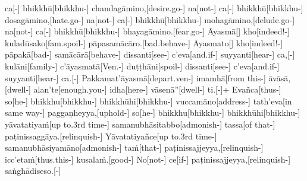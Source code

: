\documentclass[12pt]{article}
\newcommand{\EnglishColumn}[1]{\itshape\footnotesize{#1}}
\begin{document}
\begin{paracol}{2}
\begin{column}
\begin{flushleft}
ca[-\NUL{\GMU{}}] bhikkhū[bhikkhu-] chandagāmino,[desire.go-] na[not-] ca[-\NUL{\GMU{}}] bhikkhū[bhikkhu-] dosagāmino,[hate.go-] na[not-] ca[-\NUL{\GMU{}}] bhikkhū[bhikkhu-] mohagāmino,[delude.go-] na[not-] ca[-\NUL{\GMU{}}] bhikkhū[bhikkhu-] bhayagāmino.[fear.go-] Āyasmā[] kho[indeed!-] kuladūsako[fam.spoil-] pāpasamācāro.[bad.behave-] Āyasmato[] kho[indeed!-] pāpakā[bad-] samācārā[behave-] dissanti[see-] c’eva[and.if-\NUL{\GMU{}}] suyyanti[hear-] ca,[-\NUL{\GMU{}}] kulāni[family-] c’āyasmatā[Ven.-] duṭṭhāni[spoil-] dissanti[see-] c’eva[and.if-\NUL{\GMU{}}] suyyanti[hear-] ca.[-\NUL{\GMU{}}] Pakkamat’āyasmā[depart.ven-] imamhā[from this-] āvāsā,[dwell-] alan’te[enough.you-] idha[here-] vāsenā”[dwell-] ti.[-\NUL{\GMU{}}]+ Evañca[thus-] so[he-] bhikkhu[bhikkhu-] bhikkhūhi[bhikkhu-] vuccamāno[address-] tath’eva[in same way-\NUL{\GMU{}}] paggaṇheyya,[uphold-] so[he-] bhikkhu[bhikkhu-] bhikkhūhi[bhikkhu-] yāvatatiyaṁ[up to.3rd time-] samanubhāsitabbo[admonish-] tassa[of that-] paṭinissaggāya.[relinquish-] Yāvatatiyañce[up to.3rd time-] samanubhāsiyamāno[admonish-] taṁ[that-] paṭinissajjeyya,[relinquish-] icc’etaṁ[thus.this-] kusalaṁ.[good-] No[not-] ce[if-\NUL{\GMU{}}] paṭinissajjeyya,[relinquish-] saṅghādiseso.[-\NUL{\GMU{}}]
\endgl
\switchcolumn*
\end{flushleft}


{\EnglishColumn

}
\end{column}
\end{paracol}
\end{document}
